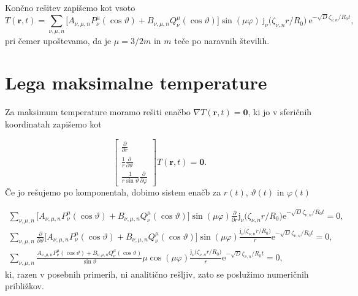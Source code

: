 \documentclass{article}
\def\phi{\varphi}
\def\theta{\vartheta}
\newcommand{\vect}[1]{\boldsymbol{#1}}
\begin{document}
Končno rešitev zapišemo kot vsoto
\begin{equation}
T(\vect r, t) = \sum_{\nu, \mu, n} \Big[A_{\nu, \mu, n} P_\nu^\mu(\cos \theta) + B_{\nu, \mu, n} Q_\nu^\mu(\cos \theta) \Big]
	\sin(\mu \phi) \:
	\mathrm{j}_\nu \big(\zeta_{\nu, n} r/R_0\big) \:
	\mathrm{e}^{-\sqrt{D} \zeta_{\nu, n}/R_0 t},
\label{eq:splosna}
\end{equation}
pri čemer upoštevamo, da je $\mu = 3/2m$ in $m$ teče po naravnih številih.

\vspace{0.5cm}









\section{Lega maksimalne temperature}


Za maksimum temperature moramo rešiti enačbo $\nabla T(\vect r, t) = \vect 0$, ki jo v sferičnih koordinatah zapišemo kot

\begin{equation}
\begin{bmatrix}
\frac{\partial}{\partial r} \\
\frac{1}{r}\frac{\partial}{\partial \theta} \\
\frac{1}{r \sin \theta}\frac{\partial}{\partial \phi}
\end{bmatrix}
 T(\vect r, t) = \vect 0.
\end{equation}
Če jo rešujemo po komponentah, dobimo sistem enačb za $r(t)$, $\theta(t)$ in $\phi(t)$

\begin{equation}
\begin{split}
\sum_{\nu, \mu, n}  \Big[A_{\nu, \mu, n} P_\nu^\mu(\cos \theta) + B_{\nu, \mu, n} Q_\nu^\mu(\cos \theta) \Big]
	\sin(\mu \phi)\frac{\partial}{\partial r} \mathrm{j}_\nu \big(\zeta_{\nu, n} r/R_0\big)
	\mathrm{e}^{-\sqrt{D} \zeta_{\nu, n}/R_0 t} = 0, \\
\sum_{\nu, \mu, n} \frac{\partial}{\partial \theta} \Big[A_{\nu, \mu, n} P_\nu^\mu(\cos \theta) + B_{\nu, \mu, n} Q_\nu^\mu(\cos \theta) \Big]
	\sin(\mu \phi) \frac{ \mathrm{j}_\nu \big(\zeta_{\nu, n} r/R_0\big)}{r}
	\mathrm{e}^{-\sqrt{D} \zeta_{\nu, n}/R_0 t} = 0, \\
\sum_{\nu, \mu, n} \frac{A_{\nu, \mu, n} P_\nu^\mu(\cos \theta) + B_{\nu, \mu, n} Q_\nu^\mu(\cos \theta)}{\sin \theta}
	\mu \cos(\mu \phi) \frac{\mathrm{j}_\nu \big(\zeta_{\nu, n} r/R_0\big)}{r}
	\mathrm{e}^{-\sqrt{D} \zeta_{\nu, n}/R_0 t} = 0,
\end{split}
\end{equation}
ki, razen v posebnih primerih, ni analitično rešljiv, zato se poslužimo numeričnih približkov.
\end{document}
